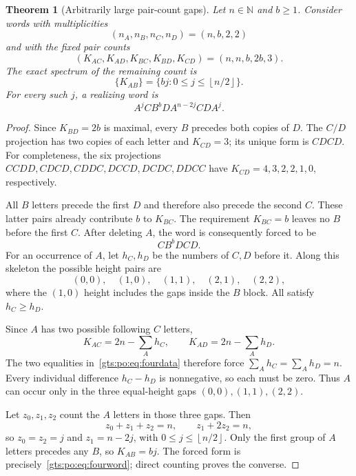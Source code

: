 \documentclass[11pt,letterpaper]{article}
\newtheorem{theorem}{Theorem}[section]
\theoremstyle{definition}
\theoremstyle{remark}
\newcommand{\N}{\mathbb N}
\newcommand{\floor}[1]{\left\lfloor #1\right\rfloor}
\begin{document}
\begin{theorem}[Arbitrarily large pair-count gaps]\label{gts:po:thm:fourletter}
Let $n\in\N$ and $b\ge1$. Consider words with multiplicities
\[
 (n_A,n_B,n_C,n_D)=(n,b,2,2)
\]
and with the fixed pair counts
\begin{equation}\label{gts:po:eq:fourdata}
 (K_{AC},K_{AD},K_{BC},K_{BD},K_{CD})=(n,n,b,2b,3).
\end{equation}
The exact spectrum of the remaining count is
\begin{equation}\label{gts:po:eq:fourfamily}
 \{K_{AB}\}=\{bj:0\le j\le\floor{n/2}\}.
\end{equation}
For every such $j$, a realizing word is
\begin{equation}\label{gts:po:eq:fourword}
 A^jCB^bDA^{n-2j}CDA^j.
\end{equation}
\end{theorem}
\begin{proof}
Since $K_{BD}=2b$ is maximal, every $B$ precedes both copies of $D$. The $C/D$ projection has two copies of each letter and $K_{CD}=3$; its unique form is $CDCD$. For completeness, the six projections $CCDD,CDCD,CDDC,DCCD,DCDC,DDCC$ have $K_{CD}=4,3,2,2,1,0$, respectively.

All $B$ letters precede the first $D$ and therefore also precede the second $C$. These latter pairs already contribute $b$ to $K_{BC}$. The requirement $K_{BC}=b$ leaves no $B$ before the first $C$. After deleting $A$, the word is consequently forced to be
\begin{equation}\label{gts:po:eq:skeleton}
 CB^bDCD.
\end{equation}
For an occurrence of $A$, let $h_C,h_D$ be the numbers of $C,D$ before it. Along this skeleton the possible height pairs are
\[
 (0,0),\quad (1,0),\quad (1,1),\quad (2,1),\quad (2,2),
\]
where the $(1,0)$ height includes the gaps inside the $B$ block. All satisfy $h_C\ge h_D$.

Since $A$ has two possible following $C$ letters,
\[
 K_{AC}=2n-\sum_A h_C,
 \qquad K_{AD}=2n-\sum_A h_D.
\]
The two equalities in~\eqref{gts:po:eq:fourdata} therefore force
$\sum_A h_C=\sum_A h_D=n$. Every individual difference $h_C-h_D$ is nonnegative, so each must be zero. Thus $A$ can occur only in the three equal-height gaps $(0,0),(1,1),(2,2)$.

Let $z_0,z_1,z_2$ count the $A$ letters in those three gaps. Then
\[
 z_0+z_1+z_2=n,\qquad z_1+2z_2=n,
\]
so $z_0=z_2=j$ and $z_1=n-2j$, with $0\le j\le\floor{n/2}$. Only the first group of $A$ letters precedes any $B$, so $K_{AB}=bj$. The forced form is precisely~\eqref{gts:po:eq:fourword}; direct counting proves the converse.
\end{proof}
\end{document}
